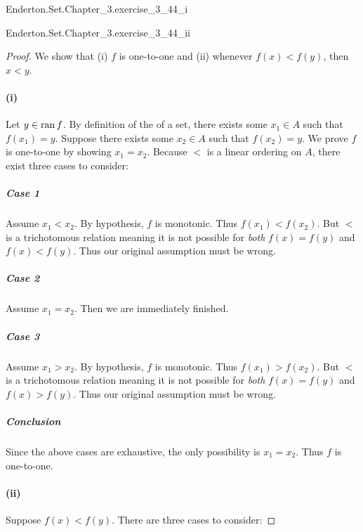 \documentclass{report}
\begin{document}
    {Enderton.Set.Chapter\_3.exercise\_3\_44\_i}

    {Enderton.Set.Chapter\_3.exercise\_3\_44\_ii}

  \begin{proof}

    We show that (i) $f$ is one-to-one and (ii) whenever $f(x) < f(y)$, then
      $x < y$.

    \paragraph{(i)}%

      Let $y \in \mathop{\text{ran}}{f}$.
      By definition of the  of a set, there exists some
        $x_1 \in A$ such that $f(x_1) = y$.
      Suppose there exists some $x_2 \in A$ such that $f(x_2) = y$.
      We prove $f$ is one-to-one by showing $x_1 = x_2$.
      Because $<$ is a linear ordering on $A$, there exist three cases to
        consider:

      \subparagraph{Case 1}%

        Assume $x_1 < x_2$.
        By hypothesis, $f$ is monotonic.
        Thus $f(x_1) < f(x_2)$.
        But $<$ is a trichotomous relation meaning it is not possible for
          \textit{both} $f(x) = f(y)$ and $f(x) < f(y)$.
        Thus our original assumption must be wrong.

      \subparagraph{Case 2}%

        Assume $x_1 = x_2$.
        Then we are immediately finished.

      \subparagraph{Case 3}%

        Assume $x_1 > x_2$.
        By hypothesis, $f$ is monotonic.
        Thus $f(x_1) > f(x_2)$.
        But $<$ is a trichotomous relation meaning it is not possible for
          \textit{both} $f(x) = f(y)$ and $f(x) > f(y)$.
        Thus our original assumption must be wrong.

      \subparagraph{Conclusion}%

        Since the above cases are exhaustive, the only possibility is
          $x_1 = x_2$.
        Thus $f$ is one-to-one.

    \paragraph{(ii)}%

      Suppose $f(x) < f(y)$.
      There are three cases to consider:


\end{proof}
\end{document}
